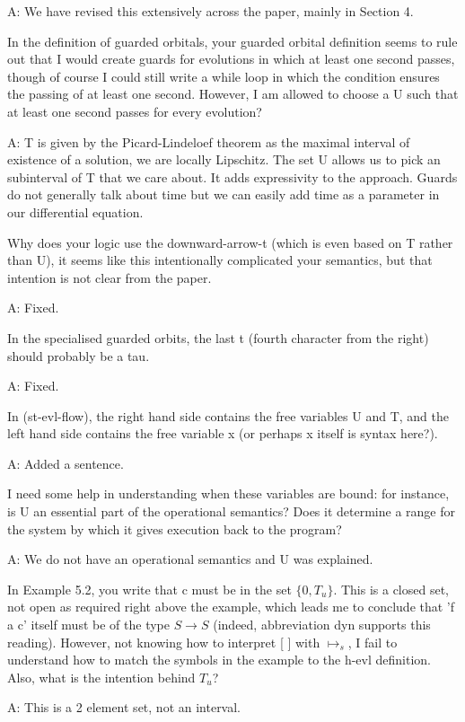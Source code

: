 \documentclass[envcountsame,envcountsect]{llncs}
\begin{document}
A: We have revised this extensively across the paper, mainly in Section 4.

In the definition of guarded orbitals, your guarded orbital definition seems to rule out that I would create guards for evolutions in which at least one second passes, though of course I could still write a while loop in which the condition ensures the passing of at least one second. However, I am allowed to choose a U such that at least one second passes for every evolution? 

A: T is given by the Picard-Lindeloef theorem as the maximal interval of existence of a solution, we are locally Lipschitz. The set U allows us to pick an subinterval of T that we care about. It adds expressivity to the approach. Guards do not generally talk about time but we can easily add time as a parameter in our differential equation.

Why does your logic use the downward-arrow-t (which is even based on T rather than U), it seems like this intentionally complicated your semantics, but that intention is not clear from the paper.

A: Fixed. 

In the specialised guarded orbits, the last t (fourth character from the right) should probably be a tau.

A: Fixed.

In (st-evl-flow), the right hand side contains the free variables U and T, and the left hand side contains the free variable x (or perhaps x itself is syntax here?). 

A: Added a sentence.

I need some help in understanding when these variables are bound: for instance, is U an essential part of the operational semantics? Does it determine a range for the system by which it gives execution back to the program?

A: We do not have an operational semantics and U was explained.

In Example 5.2, you write that c must be in the set $\{0,T_u\}$. This is a closed set, not open as required right above the example, which leads me to conclude that 'f a c' itself must be of the type $S\to S$ (indeed, abbreviation dyn supports this reading). However, not knowing how to interpret [ ] with $\mapsto_s$, I fail to understand how to match the symbols in the example to the h-evl definition. Also, what is the intention behind $T_u$?

A: This is a 2 element set, not an interval.
\end{document}
